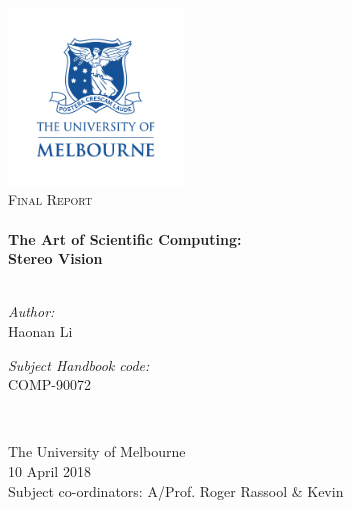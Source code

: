 \begin{titlepage}
\begin{center}

\includegraphics[width=0.35\textwidth]{figures/uom_banner.pdf}~\\[0.3cm]

\textsc{\Large Final Report}\\[0.3cm]

\HRule \\[0.3cm]
{ \huge \bfseries The Art of Scientific Computing:\\
Stereo Vision}\\[0.3cm]

\HRule \\[0.8cm]

\begin{minipage}{0.45\textwidth}
\begin{flushleft} \large
\textit{Author:}\\
Haonan Li
\end{flushleft}
\end{minipage}
\begin{minipage}{0.45\textwidth}
\begin{flushright} \large
\textit{Subject Handbook code:}\\
COMP-90072
\end{flushright}
\end{minipage}
\\[1.0cm]


\vspace{1.0cm}

The University of Melbourne
\\[0.5cm]

{\large 10 April 2018}
\\[1.5cm]

Subject co-ordinators: A/Prof. Roger Rassool \& Kevin
\\[0.8cm]


\end{center}
\end{titlepage}
